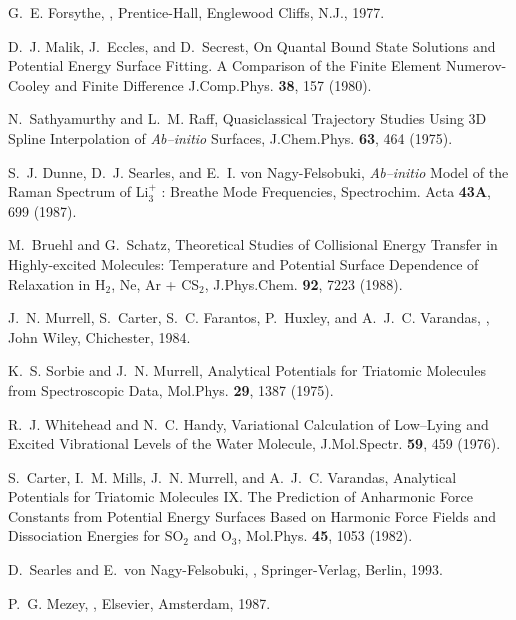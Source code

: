 \begin{thebibliography}{999}
G.~E. Forsythe,
,
\newblock Prentice-Hall, Englewood Cliffs, N.J., 1977.

D.~J. Malik, J.~Eccles, and D.~Secrest,
On Quantal Bound State Solutions and Potential Energy Surface Fitting.
A Comparison of the Finite Element Numerov-Cooley and Finite Difference 
\newblock J.Comp.Phys. {\bf 38}, 157 (1980).

N.~Sathyamurthy and L.~M. Raff,
Quasiclassical Trajectory 
Studies Using 3D Spline Interpolation of {\it Ab--initio} Surfaces,
\newblock J.Chem.Phys. {\bf 63}, 464 (1975).

S.~J. Dunne, D.~J. Searles, and E.~I. {von Nagy-Felsobuki},
{\it Ab--initio} 
Model of the Raman Spectrum of Li$_3^+$ : Breathe Mode Frequencies,
\newblock Spectrochim. Acta {\bf 43A}, 699 (1987).

M.~Bruehl and G.~Schatz,
Theoretical Studies of Collisional Energy Transfer in Highly-excited 
Molecules: Temperature and Potential Surface Dependence of Relaxation
in H$_2$, Ne, Ar + CS$_2$,
\newblock J.Phys.Chem. {\bf 92}, 7223 (1988).

J.~N. Murrell, S.~Carter, 
S.~C. Farantos, P.~Huxley, and A.~J.~C. Varandas,
,
\newblock John Wiley, Chichester, 1984.

K.~S. Sorbie and J.~N. Murrell,
Analytical Potentials for Triatomic Molecules from Spectroscopic Data,
\newblock Mol.Phys. {\bf 29}, 1387 (1975).

R.~J. Whitehead and N.~C. Handy,
Variational Calculation of Low--Lying and Excited Vibrational Levels of
the Water Molecule,
\newblock J.Mol.Spectr. {\bf 59}, 459 (1976).


S.~Carter, I.~M. Mills, J.~N. Murrell, and A.~J.~C. Varandas,
Analytical Potentials for Triatomic Molecules IX. The Prediction of 
Anharmonic Force Constants from Potential Energy Surfaces Based on
Harmonic Force Fields and Dissociation Energies for SO$_2$ and O$_3$,
\newblock Mol.Phys. {\bf 45}, 1053 (1982).

D.~Searles and E.~{von Nagy-Felsobuki},
,
\newblock Springer-Verlag, Berlin, 1993.

P.~G. Mezey,
,
\newblock Elsevier, Amsterdam, 1987.




\end{thebibliography}
